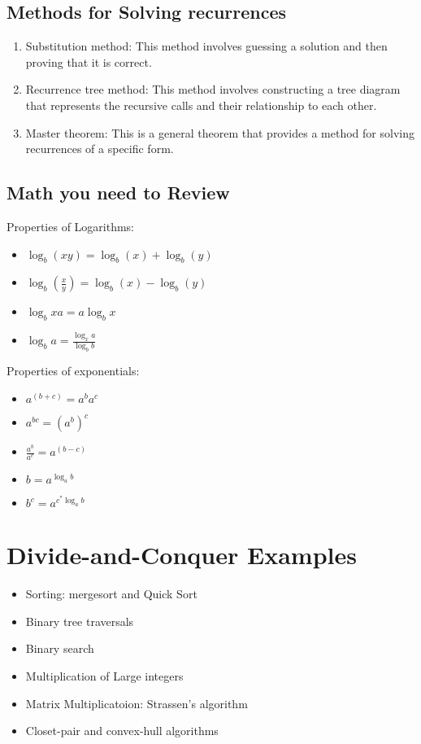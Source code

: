 \documentclass{article}
\begin{document}
\subsection{Methods for Solving recurrences}
\begin{enumerate}
    \item Substitution method: This method involves guessing a solution and then proving that it is correct.
    \item Recurrence tree method: This method involves constructing a tree diagram that represents the recursive calls and their relationship to each other.
    \item Master theorem: This is a general theorem that provides a method for solving recurrences of a specific form.
\end{enumerate}
\subsection{Math you need to Review}
Properties of Logarithms:
\begin{itemize}
    \item $\log_b (xy) = \log_b(x) + \log_b(y)$
    \item $\log_b(\frac{x}{y}) = \log_b(x) - \log_b(y)$
    \item $\log_b xa = a\log_b x$
    \item $\log_b a = \frac{\log_x a}{\log_b b}$
\end{itemize}
Properties of exponentials:
\begin{itemize}
    \item $a^{(b+c)} = a^b a^c$
    \item $a^{bc} = (a^b) ^c$
    \item $\frac{a^b}{a^c} = a^{(b-c)}$
    \item $b = a^{\log_a b}$
    \item $b^c = a^{c^*\log_a b}$
\end{itemize}
\section{Divide-and-Conquer Examples}
\begin{itemize}
	\item Sorting: mergesort and Quick Sort
	\item Binary tree traversals
	\item Binary search 
	\item Multiplication of Large integers 
	\item Matrix Multiplicatoion: Strassen's algorithm 
	\item Closet-pair and convex-hull algorithms
\end{itemize}
\end{document}
